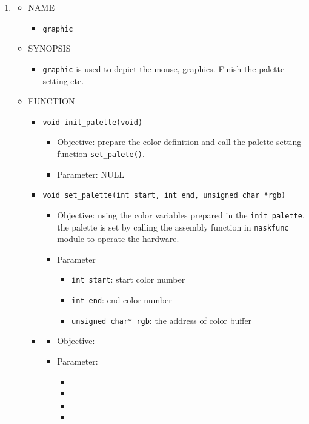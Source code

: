 \documentclass{swfcthesis}
\begin{document}
\begin{enumerate}
\item
  \begin{itemize}
  \item NAME
    \begin{itemize}
    \item \texttt{graphic}
    \end{itemize}
    
  \item SYNOPSIS
    \begin{itemize}
    \item \texttt{graphic} is used to depict the mouse, graphics. Finish the palette setting etc.
    \end{itemize}
    
  \item FUNCTION
    \begin{itemize}
    \item \texttt{void init\_palette(void)}
      \begin{itemize}
      \item Objective: prepare the color definition and call the palette setting function
        \texttt{set\_palete()}.
      \item Parameter: NULL
      \end{itemize}
      
    \item \texttt{void set\_palette(int start, int end, unsigned char *rgb)}
      \begin{itemize}
      \item Objective: using the color variables prepared in the \texttt{init\_palette},
        the palette is set by calling the assembly function in \texttt{naskfunc} module to
        operate the hardware.
      \item Parameter
        \begin{itemize}
        \item \texttt{int start}: start color number
        \item \texttt{int end}: end color number
        \item \texttt{unsigned char* rgb}: the address of color buffer
        \end{itemize}
      \end{itemize}

    \item \texttt{}
      \begin{itemize}
      \item Objective:
      \item Parameter:
        \begin{itemize}
        \item
        \item
        \item
        \item
        \end{itemize}
      \end{itemize}
      

\end{itemize}
\end{itemize}
\end{enumerate}
\end{document}
